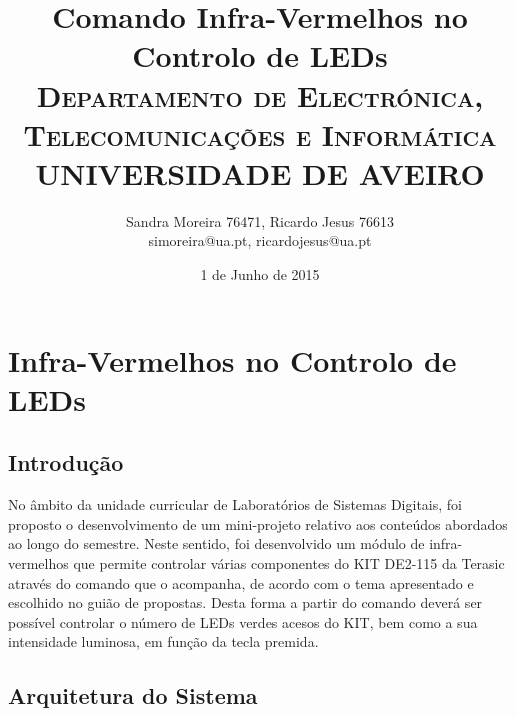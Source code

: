 \documentclass[a4paper,11pt,openright,oneside]{report}
\begin{document}
\title{\textbf{Comando Infra-Vermelhos no Controlo de LEDs}\\[1cm]\textsc{\small {Departamento de Electrónica, Telecomunicações e Informática} \\ \large {UNIVERSIDADE DE AVEIRO}}}
\author{Sandra Moreira 76471, Ricardo Jesus 76613\\simoreira@ua.pt, ricardojesus@ua.pt}
\date{1 de Junho de 2015}
\maketitle
{}

\chapter{Infra-Vermelhos no Controlo de LEDs}

\section{Introdução}
\label{sec:introdução}

No âmbito da unidade curricular de Laboratórios de Sistemas Digitais, foi proposto o desenvolvimento de um mini-projeto relativo aos conteúdos abordados ao longo do semestre. Neste sentido, foi desenvolvido um módulo de infra-vermelhos que permite controlar várias componentes do KIT DE2-115 da Terasic através do comando que o acompanha, de acordo com o tema apresentado e escolhido no guião de propostas. Desta forma a partir do comando deverá ser possível controlar o número de LEDs verdes acesos do KIT, bem como a sua intensidade luminosa, em função da tecla premida.

\section{Arquitetura do Sistema}
\label{sec:arquitetura}
\end{document}
